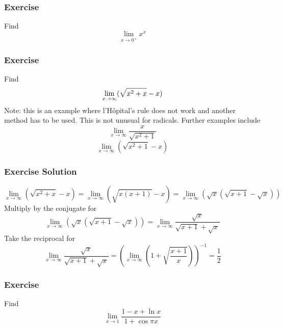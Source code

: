 \documentclass[xcolor=dvipsnames]{beamer}
\begin{document}
\begin{frame}
  \frametitle{Exercise}
  {\ubung} Find
  \begin{equation}
    \label{eq:mahpeilu}
    \lim_{x\rightarrow{}0^{+}}x^{x}
  \end{equation}
\end{frame}

\begin{frame}
  \frametitle{Exercise}
  {\ubung} Find
  \begin{equation}
    \label{eq:eigahrai}
    \lim_{x\rightarrow\infty}(\sqrt{x^{2}+x}-x)\notag
  \end{equation}
  Note: this is an example where l'H{\^o}pital's rule does not work
  and another method has to be used. This is not unusual for radicals.
  Further examples include
  \begin{equation}
    \label{eq:pahxoquu}
    \lim_{x\rightarrow{}\infty}\frac{x}{\sqrt{x^{2}+1}}
  \end{equation}
  \begin{equation}
    \label{eq:roquaevi}
    \lim_{x\rightarrow\infty}(\sqrt{x^{2}+1}-x)
  \end{equation}
\end{frame}

\begin{frame}
  \frametitle{Exercise Solution}
  \begin{equation}
    \label{eq:erahdahv}
    \lim_{x\rightarrow\infty}(\sqrt{x^{2}+x}-x)=\lim_{x\rightarrow\infty}(\sqrt{x(x+1)}-x)=\lim_{x\rightarrow\infty}(\sqrt{x}(\sqrt{x+1}-\sqrt{x}))
  \end{equation}
  Multiply by the conjugate for
  \begin{equation}
    \label{eq:heetheer}
    \lim_{x\rightarrow\infty}(\sqrt{x}(\sqrt{x+1}-\sqrt{x}))=\lim_{x\rightarrow{}\infty}\frac{\sqrt{x}}{\sqrt{x+1}+\sqrt{x}}
  \end{equation}
  Take the reciprocal for
  \begin{equation}
    \label{eq:quahgoec}
    \lim_{x\rightarrow{}\infty}\frac{\sqrt{x}}{\sqrt{x+1}+\sqrt{x}}=\left(\lim_{x\rightarrow{}\infty}\left(1+\sqrt{\frac{x+1}{x}}\right)\right)^{-1}=\frac{1}{2}
  \end{equation}
\end{frame}

\begin{frame}
  \frametitle{Exercise}
  {\ubung} Find
  \begin{equation}
    \label{eq:vuciecha}
    \lim_{x\rightarrow{}1}\frac{1-x+\ln{}x}{1+\cos\pi{}x}
  \end{equation}
\end{frame}
\end{document}
